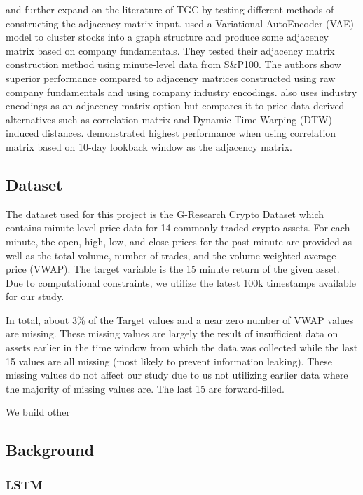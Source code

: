 \cite{Hou2021} and \cite{Peng2021} further expand on the literature of TGC by testing different methods of constructing the adjacency matrix input. \cite{Hou2021} used a Variational AutoEncoder (VAE) model to cluster stocks into a graph structure and produce some adjacency matrix based on company fundamentals. They tested their adjacency matrix construction method using minute-level data from S\&P100. The authors show superior performance compared to adjacency matrices constructed using raw company fundamentals and using company industry encodings. \cite{Peng2021} also uses industry encodings as an adjacency matrix option but compares it to price-data derived alternatives such as correlation matrix and Dynamic Time Warping (DTW) induced distances. \citeauthor{Peng2021} demonstrated highest performance when using correlation matrix based on 10-day lookback window as the adjacency matrix.

\subsection{Dataset} \label{Dataset}

The dataset used for this project is the G-Research Crypto Dataset which contains minute-level price data for 14 commonly traded crypto assets. For each minute, the open, high, low, and close prices for the past minute are provided as well as the total volume, number of trades, and the volume weighted average price (VWAP). The target variable is the 15 minute return of the given asset. Due to computational constraints, we utilize the latest 100k timestamps available for our study.

In total, about 3\% of the Target values and a near zero number of VWAP values are missing. These missing values are largely the result of insufficient data on assets earlier in the time window from which the data was collected while the last 15 values are all missing (most likely to prevent information leaking). These missing values do not affect our study due to us not utilizing earlier data where the majority of missing values are. The last 15 are forward-filled.

We build other 

\subsection{Background} \label{Background}

\subsubsection{LSTM} \label{LSTM}


